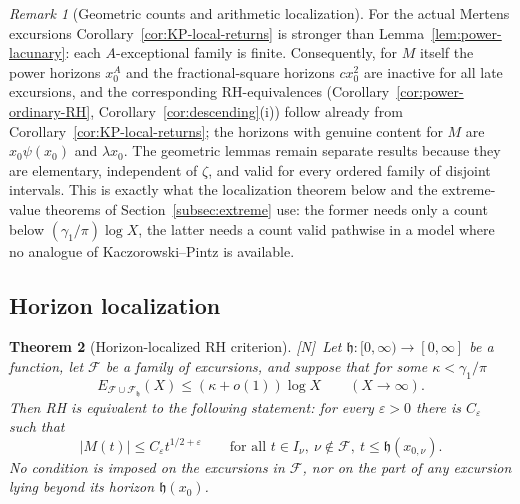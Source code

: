 \documentclass[11pt]{amsart}
\numberwithin{equation}{section}
\theoremstyle{plain}
\newtheorem{theorem}{Theorem}[section]
\theoremstyle{definition}
\theoremstyle{remark}
\newtheorem{remark}[theorem]{Remark}
\newcommand{\eps}{\varepsilon}
\newcommand{\F}{\mathcal{F}}
\newcommand{\tagN}{\textup{[N]}}
\begin{document}
\begin{remark}[Geometric counts and arithmetic localization]
\label{rem:geom-vs-arith}
For the actual Mertens excursions Corollary~\ref{cor:KP-local-returns} is
stronger than Lemma~\ref{lem:power-lacunary}: each $A$-exceptional family is
finite. Consequently, for $M$ itself the power horizons $x_0^A$ and the
fractional-square horizons $cx_0^2$ are inactive for all late excursions,
and the corresponding RH-equivalences (Corollary~\ref{cor:power-ordinary-RH},
Corollary~\ref{cor:descending}(i)) follow already from
Corollary~\ref{cor:KP-local-returns}; the horizons with genuine content for
$M$ are $x_0\psi(x_0)$ and $\lambda x_0$. The geometric lemmas remain separate results because they are
elementary, independent of $\zeta$, and valid for every ordered family of
disjoint intervals. This is exactly what the localization theorem below and
the extreme-value theorems of Section~\ref{subsec:extreme} use: the former
needs only a count below $(\gamma_1/\pi)\log X$, the latter needs a count
valid pathwise in a model where no analogue of Kaczorowski--Pintz is
available.
\end{remark}

\subsection{Horizon localization}
\label{subsec:horizon}

\begin{theorem}[Horizon-localized RH criterion]
\label{thm:horizon}
\tagN\ Let $\mathfrak h:[0,\infty)\to[0,\infty]$ be a function, let $\F$ be a family
of excursions, and suppose that for some $\kappa<\gamma_1/\pi$
\begin{equation}
\label{eq:horizon-hyp}
E_{\F\cup\F_{\mathfrak h}}(X)\le(\kappa+o(1))\log X\qquad(X\to\infty).
\end{equation}
Then RH is equivalent to the following statement: for every $\eps>0$ there
is $C_\eps$ such that
\begin{equation}
\label{eq:restricted-RH}
|M(t)|\le C_\eps t^{1/2+\eps}
\qquad\text{for all }t\in I_\nu,\ \nu\notin\F,\ t\le \mathfrak h(x_{0,\nu}).
\end{equation}
No condition is imposed on the excursions in $\F$, nor on the part of any
excursion lying beyond its horizon $\mathfrak h(x_0)$.
\end{theorem}
\end{document}
